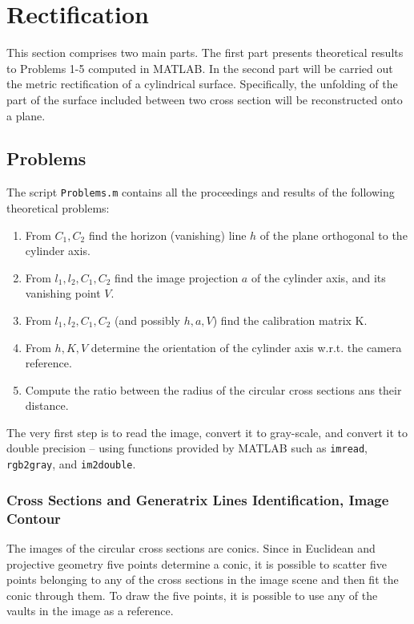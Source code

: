 \documentclass[12pt,a4paper]{article}
\begin{document}
\section{Rectification}
\label{sec:reconstruction}
This section comprises two main parts. The first part presents theoretical results to Problems 1-5 computed in MATLAB. In the second part will be carried out the metric rectification of a cylindrical surface. Specifically, the unfolding of the part of the surface included between two cross section will be reconstructed onto a plane.

\subsection{Problems}
\label{sec:problems}
The script \verb|Problems.m| contains all the proceedings and results of the following theoretical problems:
\begin{enumerate}
    \item From $C_1,C_2$ find the horizon (vanishing) line $h$ of the plane orthogonal to the cylinder axis.
    \item From $l_1,l_2,C_1,C_2$ find the image projection $a$ of the cylinder axis, and its vanishing point $V$.
    \item From $l_1,l_2,C_1,C_2$ (and possibly $h,a,V$) find the calibration matrix K.
    \item From $h,K,V$ determine the orientation of the cylinder axis w.r.t. the camera reference.
    \item Compute the ratio between the radius of the circular cross sections ans their distance.
\end{enumerate}
\bigskip
The very first step is to read the image, convert it to gray-scale, and convert it to double precision -- using functions provided by MATLAB such as \verb|imread|, \verb|rgb2gray|, and \verb|im2double|.

\subsubsection{Cross Sections and Generatrix Lines Identification, Image Contour}\label{sec:toImageContour}
The images of the circular cross sections are conics. Since in Euclidean and projective geometry five points determine a conic, it is possible to scatter five points belonging to any of the cross sections in the image scene and then fit the conic through them. To draw the five points, it is possible to use any of the vaults in the image as a reference.\\
\end{document}

